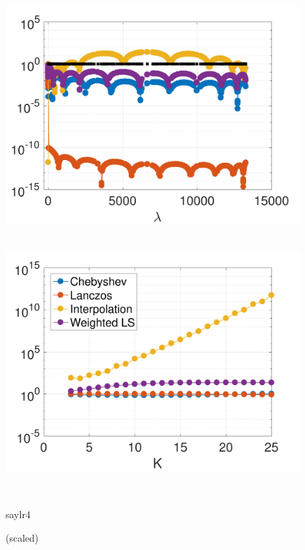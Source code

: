 \documentclass{article}
\begin{document}
\begin{figure}[bth]
\begin{minipage}[m]{0.44\linewidth}
\centerline{~~\includegraphics[width=.95\linewidth]{fig_saylr4_deg10_2}}
\end{minipage}
\begin{minipage}[m]{0.44\linewidth}
\centerline{~~\includegraphics[width=.95\linewidth]{fig_saylr4_err_const_b2}}
\end{minipage}\\
\begin{minipage}[m]{0.1\linewidth}
\centerline{\small{saylr4}}
\centerline{\small{(scaled)}}
\end{minipage}
\begin{minipage}[m]{0.44\linewidth}

\end{minipage}
\end{figure}
\end{document}
